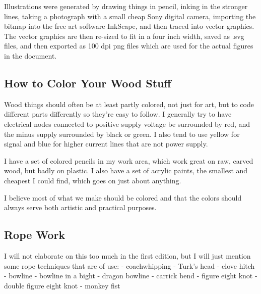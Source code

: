 Illustrations were generated by drawing things in pencil, inking in the
stronger lines, taking a photograph with a small cheap Sony digital
camera, importing the bitmap into the free art software InkScape, and
then traced into vector graphics. The vector graphics are then re-sized
to fit in a four inch width, saved as .svg files, and then exported as
100 dpi png files which are used for the actual figures in the document.

\subsection{How to Color Your Wood
Stuff}\label{how-to-color-your-wood-stuff}

Wood things should often be at least partly colored, not just for art,
but to code different parts differently so they're easy to follow. I
generally try to have electrical nodes connected to positive supply
voltage be surrounded by red, and the minus supply surrounded by black
or green. I also tend to use yellow for signal and blue for higher
current lines that are not power supply.

I have a set of colored pencils in my work area, which work great on
raw, carved wood, but badly on plastic. I also have a set of acrylic
paints, the smallest and cheapest I could find, which goes on just about
anything.

I believe most of what we make should be colored and that the colors
should always serve both artistic and practical purposes.

\subsection{Rope Work}\label{rope-work}

I will not elaborate on this too much in the first edition, but I will
just mention some rope techniques that are of use: - coachwhipping -
Turk's head - clove hitch - bowline - bowline in a bight - dragon
bowline - carrick bend - figure eight knot - double figure eight knot -
monkey fist
